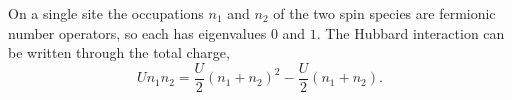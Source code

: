 \documentclass{article}
\begin{document}
On a single site the occupations $n_1$ and $n_2$ of the two spin species are fermionic number operators,
so each has eigenvalues $0$ and $1$. The Hubbard interaction can be written through the total charge,
\begin{equation}
U n_1 n_2 = \frac{U}{2}\left(n_1 + n_2\right)^2 - \frac{U}{2}\left(n_1 + n_2\right) .
\label{eq:hub}
\end{equation}
\end{document}
